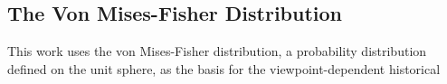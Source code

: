 \subsection{The Von Mises-Fisher Distribution}

This work uses the von Mises-Fisher distribution, a probability distribution defined on the unit sphere, as the basis for the viewpoint-dependent historical 